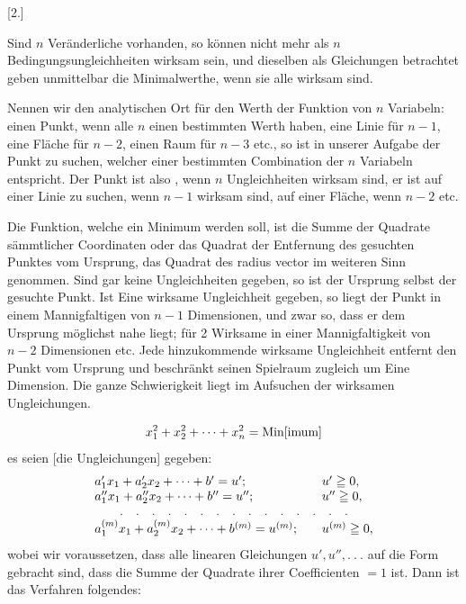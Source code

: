 \begin{center}[2.]\end{center}
\indent Sind \(n\) Veränderliche vorhanden, so können nicht mehr als \(n\) Bedingungsungleichheiten wirksam sein, und dieselben als Gleichungen betrachtet geben unmittelbar die Minimalwerthe, wenn sie alle wirksam sind.

\indent Nennen wir den analytischen Ort für den Werth der Funktion von \(n\) Variabeln: einen Punkt, wenn alle \(n\) einen bestimmten Werth haben, eine Linie für \(n-1\), eine Fläche für \(n-2\), einen Raum für \(n-3\) etc., so ist in unserer Aufgabe der Punkt zu suchen, welcher einer bestimmten Combination der \(n\) Variabeln entspricht. Der Punkt ist also , wenn \(n\) Ungleichheiten wirksam sind, er ist auf einer Linie zu suchen, wenn \(n-1\) wirksam sind, auf einer Fläche, wenn \(n-2\) etc.

\indent Die Funktion, welche ein Minimum werden soll, ist die Summe der Quadrate sämmtlicher Coordinaten oder das Quadrat der Entfernung des gesuchten Punktes vom Ursprung, das Quadrat des radius vector im weiteren Sinn genommen. Sind gar keine Ungleichheiten gegeben, so ist der Ursprung selbst der gesuchte Punkt. Ist Eine wirksame Ungleichheit gegeben, so liegt der Punkt in einem Mannigfaltigen von \(n-1\) Dimensionen, und zwar so, dass er dem Ursprung möglichst nahe liegt; für 2 Wirksame in einer Mannigfaltigkeit von \(n-2\) Dimensionen etc. Jede hinzukommende wirksame Ungleichheit entfernt den Punkt vom Ursprung und beschränkt seinen Spielraum zugleich um Eine Dimension. Die ganze Schwierigkeit liegt im Aufsuchen der wirksamen Ungleichungen.

\indent [Es soll]
\[
x_1^2+x_2^2+\mathinner{\cdotp\cdotp\cdotp}+x_n^2=\mathrm{Min[imum]}
\]
 es seien [die Ungleichungen] gegeben:
\clearpage{}
\[
\begin{array}{@{}l@{\qquad}l@{}}
a_1'x_1+a_2'x_2+\mathinner{\cdotp\cdotp\cdotp}+b'=u';&u'\geqq0,\\
a_1''x_1+a_2''x_2+\mathinner{\cdotp\cdotp\cdotp}+b''=u'';&u''\geqq0,\\
\multicolumn{2}{c}{.\quad .\quad .\quad .\quad .\quad .\quad .\quad .\quad .\quad .\quad .\quad .\quad .\quad .\quad .}\\
a_1^{(m)}x_1+a_2^{(m)}x_2+\mathinner{\cdotp\cdotp\cdotp}+b^{(m)}=u^{(m)};&u^{(m)}\geqq0,
\end{array}
\]
\noindent wobei wir voraussetzen, dass alle linearen Gleichungen \(u',u'',.\ .\ .\) auf die Form gebracht sind, dass die Summe der Quadrate ihrer Coefficienten \(=1\) ist. Dann ist das Verfahren folgendes:

